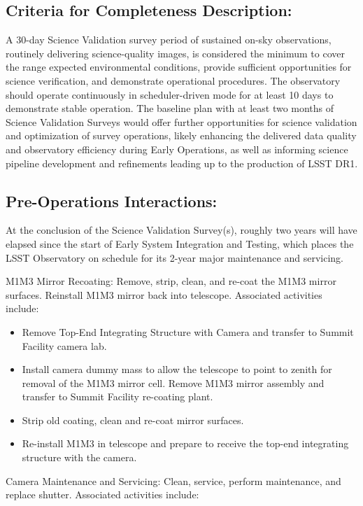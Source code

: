 \subsection{Criteria for Completeness Description:}

A 30-day Science Validation survey period of sustained on-sky observations, routinely delivering science-quality images, is considered the minimum to cover the range expected environmental conditions, provide sufficient opportunities for science verification, and demonstrate operational procedures.
The observatory should operate continuously in scheduler-driven mode for at least 10 days to demonstrate stable operation.
The baseline plan with at least two months of Science Validation Surveys would offer further opportunities for science validation and optimization of survey operations, likely enhancing the delivered data quality and observatory efficiency during Early Operations, as well as informing science pipeline development and refinements leading up to the production of LSST DR1.

\subsection{Pre-Operations Interactions:}

At the conclusion of the Science Validation Survey(s), roughly two years will have elapsed since the start of Early System Integration and Testing, which places the LSST Observatory on schedule for its 2-year major maintenance and servicing.

M1M3 Mirror Recoating: Remove, strip, clean, and re-coat the M1M3 mirror surfaces. Reinstall M1M3 mirror back into telescope. Associated activities include:

\begin{itemize}
\item Remove Top-End Integrating Structure with Camera and transfer to Summit Facility camera lab.
\item Install camera dummy mass to allow the telescope to point to zenith for removal of the M1M3 mirror cell. Remove M1M3 mirror assembly and transfer to Summit Facility re-coating plant.
\item Strip old coating, clean and re-coat mirror surfaces.
\item Re-install M1M3 in telescope and prepare to receive the top-end integrating structure with the camera.
\end{itemize}

Camera Maintenance and Servicing: Clean, service, perform maintenance, and replace shutter. Associated activities include:

